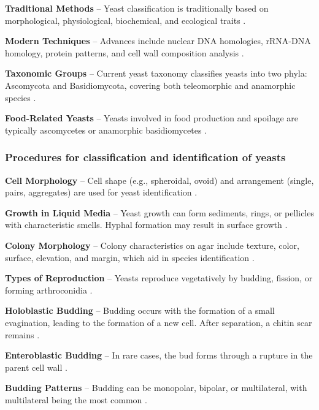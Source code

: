 \textbf{Traditional Methods} – Yeast classification is traditionally based on morphological, physiological, biochemical, and ecological traits \cite{L2-YeastClass}.

\textbf{Modern Techniques} – Advances include nuclear DNA homologies, rRNA-DNA homology, protein patterns, and cell wall composition analysis \cite{L2-YeastClass}.

\textbf{Taxonomic Groups} – Current yeast taxonomy classifies yeasts into two phyla: Ascomycota and Basidiomycota, covering both teleomorphic and anamorphic species \cite{L2-YeastClass}.

\textbf{Food-Related Yeasts} – Yeasts involved in food production and spoilage are typically ascomycetes or anamorphic basidiomycetes \cite{L2-YeastClass}.

\subsubsection{Procedures for classification and identification of yeasts}
\textbf{Cell Morphology} – Cell shape (e.g., spheroidal, ovoid) and arrangement (single, pairs, aggregates) are used for yeast identification \cite{L2-YeastClass}.

\textbf{Growth in Liquid Media} – Yeast growth can form sediments, rings, or pellicles with characteristic smells. Hyphal formation may result in surface growth \cite{L2-YeastClass}.

\textbf{Colony Morphology} – Colony characteristics on agar include texture, color, surface, elevation, and margin, which aid in species identification \cite{L2-YeastClass}.


\textbf{Types of Reproduction} – Yeasts reproduce vegetatively by budding, fission, or forming arthroconidia \cite{L2-YeastClass}.

\textbf{Holoblastic Budding} – Budding occurs with the formation of a small evagination, leading to the formation of a new cell. After separation, a chitin scar remains \cite{L2-YeastClass}.

\textbf{Enteroblastic Budding} – In rare cases, the bud forms through a rupture in the parent cell wall \cite{L2-YeastClass}.

\textbf{Budding Patterns} – Budding can be monopolar, bipolar, or multilateral, with multilateral being the most common \cite{L2-YeastClass}.

